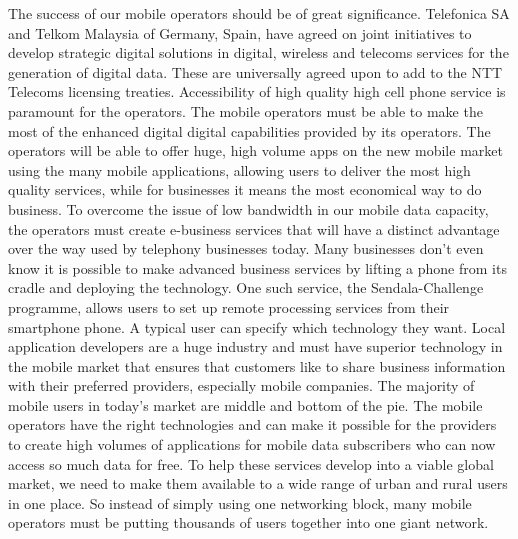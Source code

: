 \documentclass{article}%
\begin{document}
The success of our mobile operators should be of great significance.\newline%
Telefonica SA and Telkom Malaysia of Germany, Spain, have agreed on joint initiatives to develop strategic digital solutions in digital, wireless and telecoms services for the generation of digital data. These are universally agreed upon to add to the NTT Telecoms licensing treaties.\newline%
Accessibility of high quality high cell phone service is paramount for the operators.\newline%
The mobile operators must be able to make the most of the enhanced digital digital capabilities provided by its operators.\newline%
The operators will be able to offer huge, high volume apps on the new mobile market using the many mobile applications, allowing users to deliver the most high quality services, while for businesses it means the most economical way to do business.\newline%
To overcome the issue of low bandwidth in our mobile data capacity, the operators must create e{-}business services that will have a distinct advantage over the way used by telephony businesses today.\newline%
Many businesses don't even know it is possible to make advanced business services by lifting a phone from its cradle and deploying the technology.\newline%
One such service, the Sendala{-}Challenge programme, allows users to set up remote processing services from their smartphone phone. A typical user can specify which technology they want.\newline%
Local application developers are a huge industry and must have superior technology in the mobile market that ensures that customers like to share business information with their preferred providers, especially mobile companies.\newline%
The majority of mobile users in today's market are middle and bottom of the pie.\newline%
The mobile operators have the right technologies and can make it possible for the providers to create high volumes of applications for mobile data subscribers who can now access so much data for free.\newline%
To help these services develop into a viable global market, we need to make them available to a wide range of urban and rural users in one place.\newline%
So instead of simply using one networking block, many mobile operators must be putting thousands of users together into one giant network.\newline%
\end{document}
